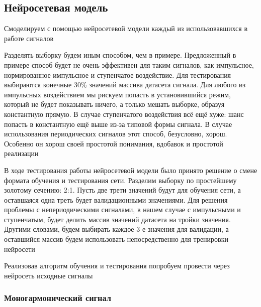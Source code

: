 \subsection{Нейросетевая модель}

Смоделируем с помощью нейросетевой модели каждый из использовавшихся в работе сигналов

Разделять выборку будем иным способом, чем в примере. Предложенный в примере способ будет не очень эффективен для таким сигналов, как импульсное, нормированное импульсное и ступенчатое воздействие.
Для тестирования выбираются конечные 30\% значений массива датасета сигнала. Для любого из импульсных воздействием мы рискуем попасть в установившийся режим,
который не будет показывать ничего, а только мешать выборке, образуя константную прямую. В случае ступенчатого воздействия всё ещё хуже: шанс попасть в константную ещё выше
из-за типовой формы сигнала. В случае использования периодических сигналов этот способ, безусловно, хорош. Особенно он хорош своей простотой понимания, вдобавок и простотой реализации

В ходе тестирования работы нейросетевой модели было принято решение о смене формата обучения и тестирования сети. Разделим выборку по простейшему золотому сечению: 2:1. Пусть две трети значений будут
для обучения сети, а оставшаяся одна треть будет валидационными значениями. Для решения проблемы с непериодическими сигналами, в нашем случае с импульсными и ступенчатым, будет делить
массив значений датасета на тройки значения. Другими словами, будем выбирать каждое 3-е значения для валидации, а оставшийся массив будем использовать непосредственно для тренировки нейросети

Реализовав алгоритм обучения и тестирования попробуем провести через нейросеть исходные сигналы

\subsubsection{Моногармонический сигнал}

